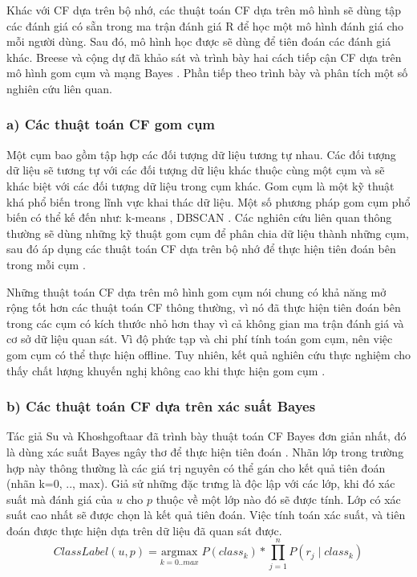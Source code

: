 
Khác với CF dựa trên bộ nhớ, các thuật toán CF dựa trên mô hình sẽ dùng tập các đánh giá có sẵn trong ma trận đánh giá R để học một mô hình đánh giá cho mỗi người dùng. Sau đó, mô hình học được sẽ dùng để tiên đoán các đánh giá khác. Breese và cộng dự đã khảo sát và trình bày hai cách tiếp cận CF dựa trên mô hình gom cụm và mạng Bayes \cite{Breese:1998:EAP:2074094.2074100}. Phần tiếp theo trình bày và phân tích một số nghiên cứu liên quan.

\subsubsection*{a) Các thuật toán CF gom cụm}
Một cụm bao gồm tập hợp các đối tượng dữ liệu tương tự nhau. Các đối tượng dữ liệu sẽ tương tự với các đối tượng dữ liệu khác thuộc cùng một cụm và sẽ khác biệt với các đối tượng dữ liệu trong cụm khác. Gom cụm là một kỹ thuật khá phổ biến trong lĩnh vực khai thác dữ liệu. Một số phương pháp gom cụm phổ biến có thể kế đến như: k-means \cite{citeulike:176467}, DBSCAN \cite{Ester96adensity-based}. Các nghiên cứu liên quan thông thường sẽ dùng những kỹ thuật gom cụm để phân chia dữ liệu thành những cụm, sau đó áp dụng các thuật toán CF dựa trên bộ nhớ để thực hiện tiên đoán bên trong mỗi cụm  \cite{Connor01clusteringitems, citeulike:6841553}.

Những thuật toán CF dựa trên mô hình gom cụm nói chung có khả năng mở rộng tốt hơn các thuật toán CF thông thường, vì nó đã thực hiện tiên đoán bên trong các cụm có kích thước nhỏ hơn thay vì cả không gian ma trận đánh giá và cơ sở dữ liệu quan sát. Vì độ phức tạp và chi phí tính toán gom cụm, nên việc gom cụm có thể thực hiện offline. Tuy nhiên, kết quả nghiên cứu thực nghiệm cho thấy chất lượng khuyến nghị không cao khi thực hiện gom cụm \cite{Su:2009:SCF}.

\subsubsection*{b) Các thuật toán CF dựa trên xác suất Bayes}
Tác giả Su và Khoshgoftaar đã trình bày thuật toán CF Bayes đơn giản nhất, đó là dùng xác suất Bayes ngây thơ để thực hiện tiên đoán \cite{Su:2009:SCF}. Nhãn lớp trong trường hợp này thông thường là các giá trị nguyên có thể gán cho kết quả tiên đoán (nhãn k=0, .., max). Giả sử những đặc trưng là độc lập với các lớp, khi đó xác suất mà đánh giá của $u$ cho $p$ thuộc về một lớp nào đó sẽ được tính. Lớp có xác suất cao nhất sẽ được chọn là kết quả tiên đoán. Việc tính toán xác suất, và tiên đoán được thực hiện dựa trên dữ liệu đã quan sát được.
\begin{equation} 
\displaystyle ClassLabel(u,p) = \underset{k = 0..max} {\mathrm{argmax}} \; P(class_{k})*
\displaystyle\prod\limits_{j=1}^{n} P( r_{j} \; | \; class_{k})
\end{equation}

